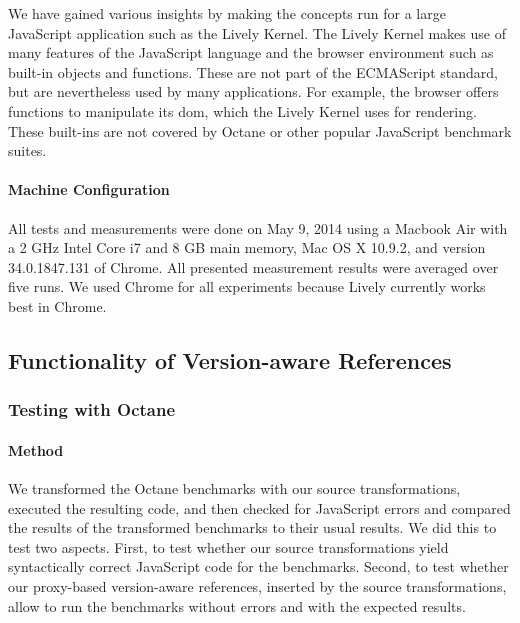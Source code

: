 \documentclass{sigplanconf}
\newcommand{\ac}[1]{\gls{#1}}
\begin{document}
We have gained various insights by making the concepts run for a large
JavaScript application such as the Lively Kernel. The Lively Kernel
makes use of many features of the JavaScript language and the browser
environment such as built-in objects and functions. These are not part
of the ECMAScript standard, but are nevertheless used by many
applications. For example, the browser offers functions to manipulate
its \ac{dom}, which the Lively Kernel uses for rendering. These
built-ins are not covered by Octane or other popular JavaScript
benchmark suites.

\paragraph{Machine Configuration}
All tests and measurements were done on May 9, 2014 using a Macbook
Air with a 2 GHz Intel Core i7 and 8 GB main memory, Mac OS X 10.9.2,
and version 34.0.1847.131 of Chrome.  All presented measurement
results were averaged over five runs. We used Chrome for all
experiments because Lively currently works best in Chrome.

\subsection{Functionality of Version-aware References} \label{sec:EVALUATION:2}

\subsubsection{Testing with Octane}

\paragraph{Method}
We transformed the Octane benchmarks with our source transformations,
executed the resulting code, and then checked for JavaScript errors
and compared the results of the transformed benchmarks to their usual
results. We did this to test two aspects.  First, to test whether our
source transformations yield syntactically correct JavaScript code for
the benchmarks.  Second, to test whether our proxy-based version-aware
references, inserted by the source transformations, allow to run the
benchmarks without errors and with the expected results.
\end{document}
